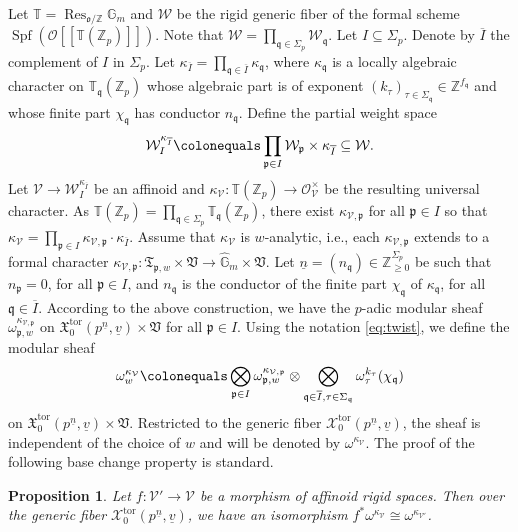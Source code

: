 \documentclass[11pt]{amsart}
\theoremstyle{definition} %
\theoremstyle{plain} %
\newtheorem{proposition}[definition]{Proposition}
\theoremstyle{remark} %
\newcommand{\GG}{{\mathbb G}}
\newcommand{\TT}{{\mathbb T}}
\newcommand{\ZZ}{{\mathbb Z}}
\newcommand{\cO}{{\mathcal O}}
\newcommand{\cV}{{\mathcal V}}
\newcommand{\cW}{{\mathcal W}}
\newcommand{\cX}{{\mathcal X}}
\newcommand{\frakT}{\mathfrak T}
\newcommand{\frakV}{\mathfrak V}
\newcommand{\frakX}{\mathfrak X}
\newcommand{\frako}{\mathfrak o}
\newcommand{\frakp}{\mathfrak p}
\newcommand{\frakq}{\mathfrak q}
\newcommand{\defeq}{\colonequals} %
\newcommand{\isom}{\cong} %
\DeclareMathOperator\Spf{Spf} %
\newcommand{\Gm}{\mathbb{G}_m} %
\newcommand{\tor}{\mathrm{tor}} %
\DeclareMathOperator\Res{Res} %
\begin{document}
Let $\TT = \Res_{\frako/\ZZ}\Gm$ and  $\cW$ be the rigid generic fiber of the formal scheme $\Spf(\cO[\![\TT(\ZZ_p)]\!])$. 
Note that $\cW = \prod_{\frakq\in \Sigma_p}\cW_\frakq$.
Let $I\subseteq \Sigma_p$.
Denote by $\overline{I}$ the complement of $I$ in $\Sigma_p$.
Let $\kappa_{\overline{I}} = \prod_{\frakq\in \overline{I}}\kappa_\frakq$, where $\kappa_\frakq$ is a locally algebraic character on $\TT_{\frakq}(\ZZ_p)$
whose algebraic part is of exponent  $(k_\tau)_{\tau\in\Sigma_\frakq}\in \ZZ^{f_\frakq}$ and whose finite part
$\chi_\frakq$ has conductor $n_\frakq$.
Define the partial weight space
\[ \cW_{I}^{\kappa_{\overline{I}}}\defeq \prod_{\frakp\in I} \cW_\frakp \times \kappa_{\overline{I}} \subseteq \cW.
\]
Let $\cV\rightarrow \cW_{I}^{\kappa_{\overline{I}}}$ be an affinoid and $\kappa_{\cV}\colon \TT(\ZZ_p) \rightarrow \cO_{\cV}^\times$
be the resulting universal character. 
As $\TT(\ZZ_p) = \prod_{\frakq\in\Sigma_p} \TT_\frakq(\ZZ_p)$, there exist $\kappa_{\cV,\frakp}$ for all $\frakp\in I$ so that  $\kappa_\cV=\prod_{\frakp\in I}\kappa_{\cV,\frakp} \cdot \kappa_{\overline{I}}$. 
Assume that $\kappa_\cV$ is $w$-analytic, i.e., each $\kappa_{\cV,\frakp}$ extends to a formal character $\kappa_{\cV,\frakp}\colon\frakT_{\frakp,w} \times \frakV\rightarrow \widehat{\GG}_m\times \frakV$.
Let $\underline{n} = (n_\frakq)\in \ZZ_{\geqslant 0}^{\Sigma_p}$ be such that $n_\frakp=0$, for all $\frakp\in I$, and $n_\frakq$ is the conductor of  the finite part $\chi_\frakq$ of $\kappa_\frakq$, for all $\frakq\in\overline{I}$.
According to the above construction, we have the $p$-adic modular sheaf $\omega_{\frakp,w}^{\kappa_{\cV,\frakp}}$ on $\frakX_0^\tor(p^{\underline{n}},\underline{v})\times \frakV$ for all $\frakp\in I$.
Using the notation \eqref{eq:twist}, we define the modular sheaf
\[
 \omega_w^{\kappa_\cV} \defeq \bigotimes_{\frakp\in I} \omega_{\frakp,w}^{\kappa_{\cV,\frakp}}  \otimes \bigotimes_{\frakq \in \overline{I},\tau\in\Sigma_\frakq} \omega_\tau^{k_\tau}(\chi_\frakq)
\]
on $\frakX_0^\tor(p^{\underline{n}},\underline{v})\times \frakV$. Restricted to the generic fiber $\cX_0^\tor(p^{\underline{n}},\underline{v})$, the sheaf is independent of  the choice of $w$ and will be denoted by  $\omega^{\kappa_\cV}$. The proof of the following  base change property is standard. 
\begin{proposition} \label{prop:sheafbasechange}
Let $f\colon \cV'\rightarrow \cV$ be a morphism of affinoid rigid spaces.
Then over the generic fiber $\cX_0^\tor(p^{\underline{n}},\underline{v})$, we have an isomorphism
$ f^\ast \omega^{\kappa_\cV}\isom \omega^{\kappa_{\cV'}}$. 
\end{proposition}
\end{document}
